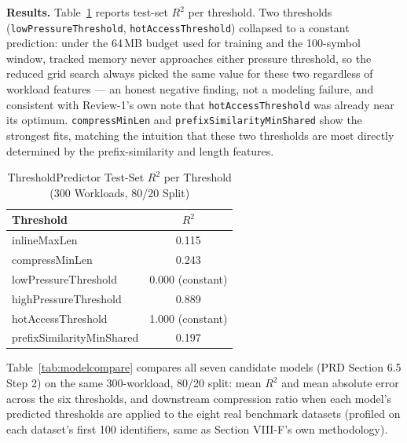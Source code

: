 \documentclass[conference]{IEEEtran}
\begin{document}
\textbf{Results.} Table~\ref{tab:r2} reports test-set $R^2$ per threshold.
Two thresholds (\texttt{lowPressureThreshold}, \texttt{hotAccessThreshold})
collapsed to a constant prediction: under the 64\,MB budget used for
training and the 100-symbol window, tracked memory never approaches either
pressure threshold, so the reduced grid search always picked the same value
for these two regardless of workload features --- an honest negative
finding, not a modeling failure, and consistent with Review-1's own note
that \texttt{hotAccessThreshold} was already near its optimum.
\texttt{compressMinLen} and \texttt{prefixSimilarityMinShared} show the
strongest fits, matching the intuition that these two thresholds are most
directly determined by the prefix-similarity and length features.

\begin{table}[htbp]
\caption{ThresholdPredictor Test-Set $R^2$ per Threshold (300 Workloads, 80/20 Split)}
\label{tab:r2}
\centering
\begin{tabular}{lc}
\toprule
Threshold & $R^2$ \\
\midrule
inlineMaxLen & 0.115 \\
compressMinLen & 0.243 \\
lowPressureThreshold & 0.000 (constant) \\
highPressureThreshold & 0.889 \\
hotAccessThreshold & 1.000 (constant) \\
prefixSimilarityMinShared & 0.197 \\
\bottomrule
\end{tabular}
\end{table}

Table~\ref{tab:modelcompare} compares all seven candidate models (PRD
Section 6.5 Step 2) on the same 300-workload, 80/20 split: mean $R^2$ and
mean absolute error across the six thresholds, and downstream compression
ratio when each model's predicted thresholds are applied to the eight real
benchmark datasets (profiled on each dataset's first 100 identifiers, same
as Section VIII-F's own methodology).
\end{document}
